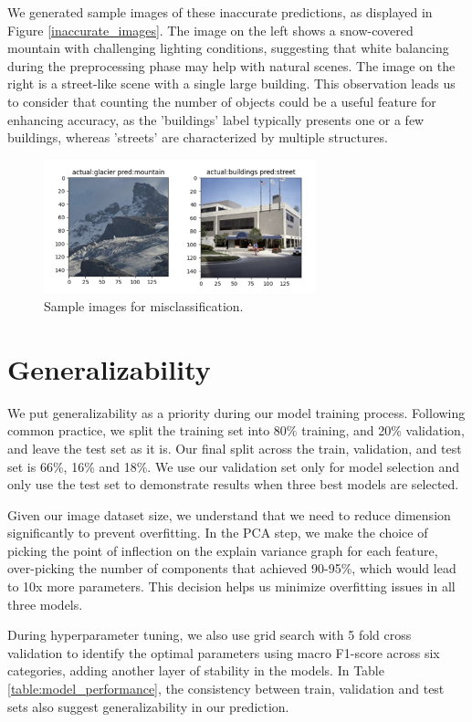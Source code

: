 \documentclass[11pt]{article}
\begin{document}
We generated sample images of these inaccurate predictions, as displayed in Figure \ref{inaccurate_images}. The image on the left shows a snow-covered mountain with challenging lighting conditions, suggesting that white balancing during the preprocessing phase may help with natural scenes. The image on the right is a street-like scene with a single large building. This observation leads us to consider that counting the number of objects could be a useful feature for enhancing accuracy, as the 'buildings' label typically presents one or a few buildings, whereas 'streets' are characterized by multiple structures.

\begin{figure}[h!]
\centering
\includegraphics[width=0.7\textwidth]{inaccurate_images.png}
\caption{Sample images for misclassification.}
\label{fig:inaccurate_images}
\end{figure}


\section{Generalizability}
We put generalizability as a priority during our model training process. Following common practice, we split the training set into 80\% training, and 20\% validation, and leave the test set as it is. Our final split across the train, validation, and test set is 66\%, 16\% and 18\%. We use our validation set only for model selection and only use the test set to demonstrate results when three best models are selected.

Given our image dataset size, we understand that we need to reduce dimension significantly to prevent overfitting. In the PCA step, we make the choice of picking the point of inflection on the explain variance graph for each feature, over-picking the number of components that achieved 90-95\%, which would lead to 10x more parameters. This decision helps us minimize overfitting issues in all three models.

During hyperparameter tuning, we also use grid search with 5 fold cross validation to identify the optimal parameters using macro F1-score across six categories, adding another layer of stability in the models. In Table \ref{table:model_performance}, the consistency between train, validation and test sets also suggest generalizability in our prediction.
\end{document}
